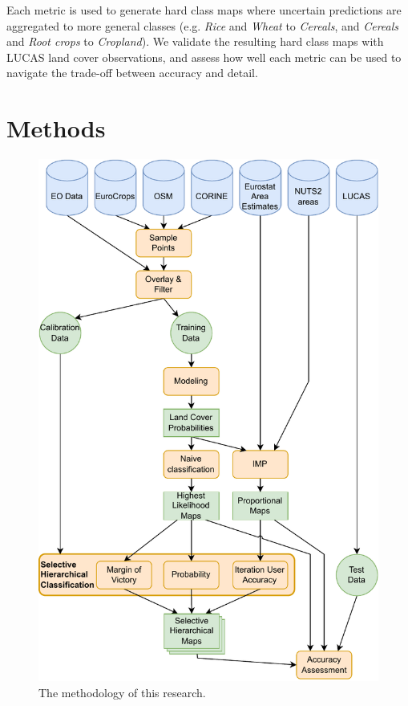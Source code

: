         Each metric is used to generate hard class maps where uncertain predictions are aggregated to more general classes (e.g. \textit{Rice} and \textit{Wheat} to \textit{Cereals}, and \textit{Cereals} and \textit{Root crops} to \textit{Cropland}). We validate the resulting hard class maps with LUCAS land cover observations, and assess how well each metric can be used to navigate the trade-off between accuracy and detail.

\section{Methods}

\begin{figure}[H]
    \centering
    \includegraphics[width=\textwidth]{figs_05/fig_methodology.pdf}
    \caption{The methodology of this research.}
    \label{fig:05_methodology}
\end{figure}

